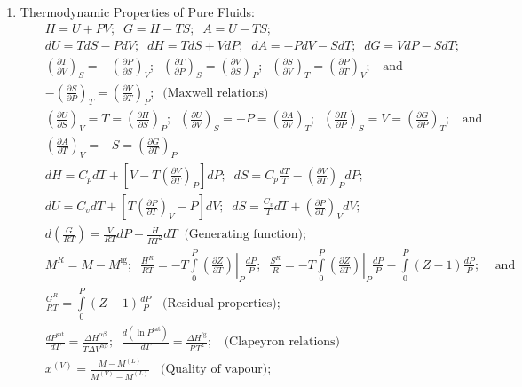 \documentclass[12pts,a4paper,amsmath,amssymb,floatfix]{article}%
\newcommand{\frc}{\displaystyle\frac}
\newcommand{\Partial}[3][error]{\left(\frc{\partial #1}{\partial #2}\right)_{#3}}
\newcommand{\mfr}[3][error]{#1_{#2}^{\left(#3\right)}}
\begin{document}
\begin{enumerate}[1)]
\item Thermodynamic Properties of Pure Fluids:
  \begin{eqnarray}
    && H = U + P V;\;\; G = H - T S;\;\; A = U - T S; \nonumber \\
    && dU = T dS - PdV;\;\; dH = TdS + VdP;\;\; dA = -PdV - SdT;\;\;dG = VdP - SdT; \nonumber \\
    && \Partial[T]{V}{S}=-\Partial[P]{S}{V};\;\;\Partial[T]{P}{S}=\Partial[V]{S}{P};\;\; \Partial[S]{V}{T}=\Partial[P]{T}{V};\;\;\text{ and } \nonumber \\
    && -\Partial[S]{P}{T}=\Partial[V]{T}{P};\;\;\text{(Maxwell relations)} \nonumber \\
    && \Partial[U]{S}{V}=T=\Partial[H]{S}{P};\;\; \Partial[U]{V}{S}=-P=\Partial[A]{V}{T};\;\; \Partial[H]{P}{S} = V = \Partial[G]{P}{T};\;\;\text{ and }\nonumber \\
    && \Partial[A]{T}{V} = -S = \Partial[G]{T}{P} \nonumber \\
    && dH = C_{p}dT + \left[V - T\Partial[V]{T}{P}\right]dP;\;\; dS = C_{p}\frc{dT}{T} - \Partial[V]{T}{P}dP; \nonumber \\
    && dU = C_{v}dT + \left[T\Partial[P]{T}{V}-P\right]dV;\;\; dS = \frc{C_{v}}{T}dT + \Partial[P]{T}{V}dV; \nonumber \\
    && d\left(\frc{G}{RT}\right) = \frc{V}{RT}dP - \frc{H}{RT^{2}}dT\;\;\text{(Generating function)}; \nonumber \\
    && M^{R} = M - M^{\text{ig}};\;\;\frc{H^{R}}{RT} = - T\int\limits_{0}^{P}\left.\Partial[Z]{T}{}\right|_{P}\frc{dP}{P}; \;\; \frc{S^{R}}{R} = -T\int\limits_{0}^{P}\left.\Partial[Z]{T}{}\right|_{P}\frc{dP}{P} - \int\limits_{0}^{P}\left(Z-1\right)\frc{dP}{P};\;\;\;\text{ and } \nonumber \\
    &&  \frc{G^{R}}{RT} =  \int\limits_{0}^{P}\left(Z-1\right)\frc{dP}{P}\;\;\text{ (Residual properties)}; \nonumber \\
    && \frc{dP^{\text{sat}}}{dT} = \frc{\Delta H^{\alpha\beta}}{T\Delta V^{\alpha\beta}};\;\; \frc{d\left(\ln{P^{\text{sat}}}\right)}{dT} = \frc{\Delta H^{\text{fg}}}{RT^{2}};\;\;\text{ (Clapeyron relations)} \nonumber \\
    && \mfr[x]{}{V} = \frc{M-\mfr[M]{}{L}}{\mfr[M]{}{V}-\mfr[M]{}{L}}\;\;\text{ (Quality of vapour)}; \nonumber
  \end{eqnarray}
  


\end{enumerate}
\end{document}
